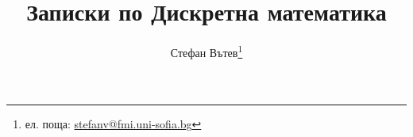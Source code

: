 \documentclass[8pt]{extreport}
\title{Записки по Дискретна математика}
\author{Стефан Вътев\thanks{ел. поща: \href{stefanv@fmi.uni-sofia.bg}{stefanv@fmi.uni-sofia.bg}}}
\theoremstyle{definition}
\begin{document}
\maketitle
\layout

\tableofcontents









% 
% 
% 
%
% 


% 



\printindex
\end{document}

